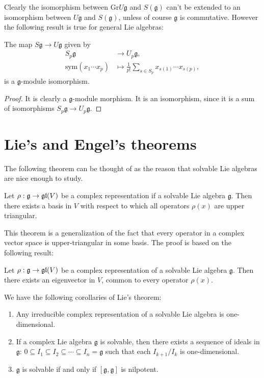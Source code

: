 \documentclass{report}
\begin{document}
Clearly the isomorphism between $\mathrm{Gr}U\mathfrak g$ and $S(\mathfrak g)$ can't be extended to an isomorphism between $U \mathfrak g$ and $S(\mathfrak g)$, unless of course $\mathfrak g$ is commutative.
However the following result is true for general Lie algebras:
\begin{proposition}
    The map $S \mathfrak g \to U \mathfrak g$ given by
    \begin{align*}
        S_p \mathfrak g &\to U_p \mathfrak g,\\
        \mathrm{sym}(x_1 \cdots x_p) &\mapsto \frac{1}{p!} \sum_{s \in S_p} x_{s(1)} \cdots x_{s(p)},
    \end{align*}
    is a $\mathfrak g$-module isomorphism.
\end{proposition}
\begin{proof}
    It is clearly a $\mathfrak g$-module morphism.
    It is an isomorphism, since it is a sum of isomorphisms $S_p \mathfrak g \to U_p \mathfrak g$.
\end{proof}

\section{Lie's and Engel's theorems}
The following theorem can be thought of as the reason that solvable Lie algebras are nice enough to study.
\begin{theorem}
    Let $\rho: \mathfrak g \to \operatorname{{\mathfrak{gl}}}(V)$ be a complex representation if a solvable Lie algebra $\mathfrak g$.
    Then there exists a basis in $V$ with respect to which all operators $\rho(x)$ are upper triangular.
\end{theorem}
This theorem is a generalization of the fact that every operator in a complex vector space is upper-triangular in some basis.
The proof is based on the following result:
\begin{proposition}
    Let $\rho: \mathfrak g \to \operatorname{{\mathfrak{gl}}}(V)$ be a complex representation of a solvable Lie algebra $\mathfrak g$.
    Then there exists an eigenvector in $V$, common to every operator $\rho(x)$.
\end{proposition}

We have the following corollaries of Lie's theorem:
\begin{corollary}
    \begin{enumerate}[label = (\roman*)]
        \item Any irreducible complex representation of a solvable Lie algebra is one-dimensional.
        \item If a complex Lie algebra $\mathfrak g$ is solvable, then there exists a sequence of ideals in $\mathfrak g$: $0 \subseteq I_1 \subseteq I_2 \subseteq \cdots \subseteq I_n = \mathfrak g$ such that each $I_{k+1}/I_k$ is one-dimensional.
        \item $\mathfrak g$ is solvable if and only if $[\mathfrak g, \mathfrak g]$ is nilpotent.
    \end{enumerate}
\end{corollary}
\end{document}
